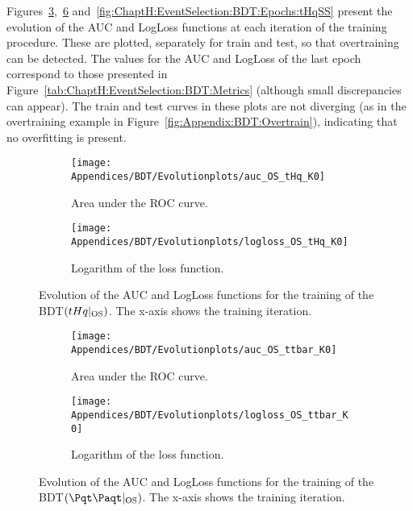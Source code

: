 Figures~\ref{fig:ChaptH:EventSelection:BDT:Epochs:tHqOS},~\ref{fig:ChaptH:EventSelection:BDT:Epochs:ttbarOS} 
and~\ref{fig:ChaptH:EventSelection:BDT:Epochs:tHqSS} present the
evolution of the AUC and LogLoss functions at each iteration of the training procedure. 
These are plotted, separately for train and test, so that overtraining can be detected.
The values for the AUC and LogLoss of the last epoch correspond to those presented
in Figure~\ref{tab:ChaptH:EventSelection:BDT:Metrics} (although small discrepancies 
can appear).
The train and test curves in these plots are not diverging (as in the overtraining example in Figure~\ref{fig:Appendix:BDT:Overtrain}),
indicating that no overfitting is present.



\begin{figure}[h]
\centering
\begin{subfigure}{.475\textwidth}
  \centering
  \texttt{[image: Appendices/BDT/Evolutionplots/auc\_OS\_tHq\_K0]}
  \caption{Area under the ROC curve.}
  \label{fig:ChaptH:EventSelection:BDT:Epochs:tHqOS:AUC}
\end{subfigure}%
\begin{subfigure}{.475\textwidth}
  \centering
  \texttt{[image: Appendices/BDT/Evolutionplots/logloss\_OS\_tHq\_K0]}
  \caption{Logarithm of the loss function.}
  \label{fig:ChaptH:EventSelection:BDT:Epochs:tHqOS:LogLoss}
\end{subfigure}
\caption{Evolution of the AUC and LogLoss functions for the training of the BDT$(tHq|_{\text{OS}})$.
The x-axis shows the training iteration.}
\label{fig:ChaptH:EventSelection:BDT:Epochs:tHqOS}
\end{figure}

\begin{figure}[h]
\centering
\begin{subfigure}{.475\textwidth}
  \centering
  \texttt{[image: Appendices/BDT/Evolutionplots/auc\_OS\_ttbar\_K0]}
  \caption{Area under the ROC curve.}
  \label{fig:ChaptH:EventSelection:BDT:Epochs:ttbarOS:AUC}
\end{subfigure}%
\begin{subfigure}{.475\textwidth}
  \centering
  \texttt{[image: Appendices/BDT/Evolutionplots/logloss\_OS\_ttbar\_K0]}
  \caption{Logarithm of the loss function.}
  \label{fig:ChaptH:EventSelection:BDT:Epochs:ttbarOS:LogLoss}
\end{subfigure}
\caption{Evolution of the AUC and LogLoss functions for the training of the BDT$(\ttbar|_{\text{OS}})$.
The x-axis shows the training iteration.}
\label{fig:ChaptH:EventSelection:BDT:Epochs:ttbarOS}
\end{figure}


